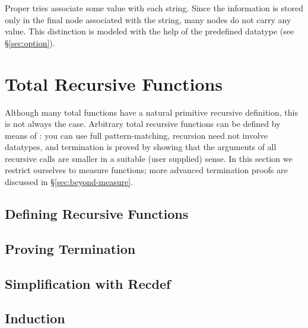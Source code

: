 Proper tries associate some value with each string. Since the
information is stored only in the final node associated with the string, many
nodes do not carry any value. This distinction is modeled with the help
of the predefined datatype  (see {\S}\ref{sec:option}).


\section{Total Recursive Functions}
\label{sec:recdef}

Although many total functions have a natural primitive recursive definition,
this is not always the case. Arbitrary total recursive functions can be
defined by means of : you can use full pattern-matching,
recursion need not involve datatypes, and termination is proved by showing
that the arguments of all recursive calls are smaller in a suitable (user
supplied) sense. In this section we restrict ourselves to measure functions;
more advanced termination proofs are discussed in {\S}\ref{sec:beyond-measure}.

\subsection{Defining Recursive Functions}
\label{sec:recdef-examples}


\subsection{Proving Termination}



\subsection{Simplification with Recdef}
\label{sec:recdef-simplification}



\subsection{Induction}


\label{sec:recdef-induction}

